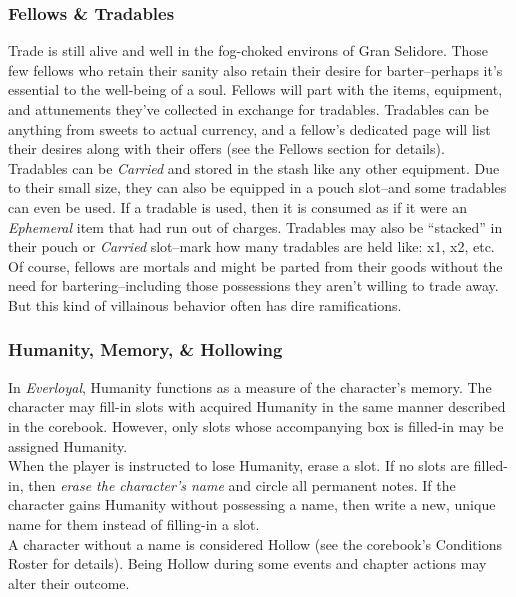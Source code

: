 \documentclass[12pt]{article}
\begin{document}
\begin{multicols*}{2}
\subsubsection{Fellows \& Tradables}
Trade is still alive and well in the fog-choked environs of Gran Selidore. Those few fellows who retain their sanity also retain their desire for barter--perhaps it’s essential to the well-being of a soul. Fellows will part with the items, equipment, and attunements they’ve collected in exchange for tradables. Tradables can be anything from sweets to actual currency, and a fellow’s dedicated page will list their desires along with their offers (see the Fellows section for details).\\
Tradables can be \emph{Carried} and stored in the stash like any other equipment. Due to their small size, they can also be equipped in a pouch slot--and some tradables can even be used. If a tradable is used, then it is consumed as if it were an \emph{Ephemeral} item that had run out of charges. Tradables may also be “stacked” in their pouch or \emph{Carried} slot--mark how many tradables are held like: x1, x2, etc.\\
Of course, fellows are mortals and might be parted from their goods without the need for bartering--including those possessions they aren’t willing to trade away. But this kind of villainous behavior often has dire ramifications.

\subsubsection{Humanity, Memory, \& Hollowing}
\hypertarget{HMN}{}\hypertarget{MEM}{}
In \emph{Everloyal}, Humanity functions as a measure of the character’s memory. The character may fill-in  slots with acquired Humanity in the same manner described in the corebook. However, only  slots whose accompanying  box is filled-in may be assigned Humanity.\\
When the player is instructed to lose Humanity, erase a  slot. If no  slots are filled-in, then \emph{erase the character’s name} and circle all permanent notes. If the character gains Humanity without possessing a name, then write a new, unique name for them instead of filling-in a  slot.\\
A character without a name is considered Hollow (see the corebook’s Conditions Roster for details). Being Hollow during some events and chapter actions may alter their outcome.


\end{multicols*}
\end{document}
